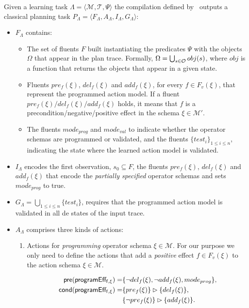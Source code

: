 \documentclass[letterpaper]{article} %
\newcommand{\tup}[1]{{\langle #1 \rangle}}
\newcommand{\pre}{\mathsf{pre}}     %
\newcommand{\cond}{\mathsf{cond}}   %
\begin{document}
Given a learning task $\Lambda=\tup{\mathcal{M},\mathcal{T},\Psi}$ the compilation defined by~\citeauthor{aineto:learningSTRIPS:ICAPS2018} outputs a classical planning task $P_{\Lambda}=\tup{F_{\Lambda},A_{\Lambda},I_{\Lambda},G_{\Lambda}}$:
\begin{itemize}
\item $F_{\Lambda}$ contains:
\begin{itemize}
\item The set of fluents $F$ built instantiating the predicates $\Psi$ with the objects $\Omega$ that appear in the plan trace. Formally, $\Omega=\bigcup_{\small s\in\mathcal{O}} obj(s)$, where $obj$ is a function that returns the objects that appear in a given state.
\item Fluents $pre_f(\xi)$, $del_f(\xi)$ and $add_f(\xi)$, for every $f\in F_v(\xi)$, that represent the programmed action model. If a fluent $pre_f(\xi)/del_f(\xi)/add_f(\xi)$ holds, it means that $f$ is a precondition/negative/positive effect in the schema $\xi\in \mathcal{M}'$. 
\item The fluents $mode_{prog}$ and $mode_{val}$ to indicate whether the operator schemas are programmed or validated, and the fluents $\{test_i\}_{1\leq i\leq n}$, indicating the state where the learned action model is validated.
\end{itemize}
\item $I_{\Lambda}$ encodes the first observation, $s_0\subseteq F$, the fluents $pre_f(\xi)$, $del_f(\xi)$ and $add_f(\xi)$ that encode the {\em partially specified} operator schemas and sets $mode_{prog}$ to true. 
\item $G_{\Lambda}=\bigcup_{1\leq i\leq n}\{test_i\}$, requires that the programmed action model is validated in all de states of the input trace.
\item $A_{\Lambda}$ comprises three kinds of actions:
\begin{enumerate}
\item Actions for {\em programming} operator schema $\xi\in\mathcal{M}$. For our purpose we only need to define the actions that add a {\em positive} effect $f\in F_v(\xi)$ to the action schema $\xi\in\mathcal{M}$.
\begin{small}
\begin{align*}
\hspace*{7pt}\pre(\mathsf{programEff_{f,\xi}})=&\{\neg del_{f}(\xi),\neg add_{f}(\xi), mode_{prog}\},\\
\cond(\mathsf{programEff_{f,\xi}})=&\{pre_{f}(\xi)\}\rhd\{del_{f}(\xi)\},\\
& \{\neg pre_{f}(\xi)\}\rhd\{add_{f}(\xi)\}.
\end{align*}
\end{small}


\end{enumerate}
\end{itemize}
\end{document}
